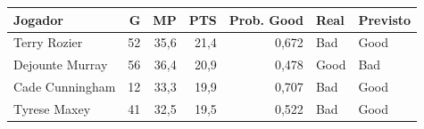\begin{tabular}{lrrrrll}
\toprule
Jogador & G & MP & PTS & Prob. Good & Real & Previsto \\
\midrule
Terry Rozier & 52 & 35,6 & 21,4 & 0,672 & Bad & Good \\
Dejounte Murray & 56 & 36,4 & 20,9 & 0,478 & Good & Bad \\
Cade Cunningham & 12 & 33,3 & 19,9 & 0,707 & Bad & Good \\
Tyrese Maxey & 41 & 32,5 & 19,5 & 0,522 & Bad & Good \\
\bottomrule
\end{tabular}
